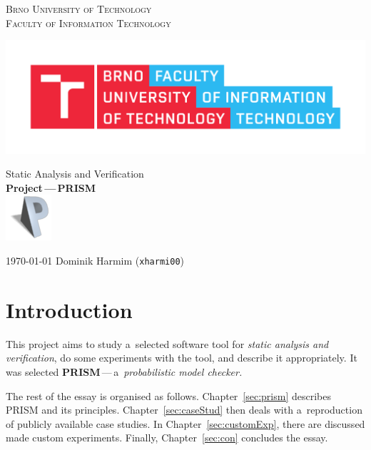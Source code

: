 \documentclass[a4paper, 11pt]{article}
\theoremstyle{definition}
\begin{document}
\begin{titlepage}
    \begin{center}
        \textsc{%
            \LARGE{Brno University of Technology} \\
            \smallskip
            \Large{Faculty of Information Technology}%
        }

        \includegraphics[width=.77 \linewidth]{FIT-logo.pdf}


        \Huge{Static Analysis and Verification} \\
        \LARGE{\textbf{Project\,---\,PRISM}} \\[1.5em]
        \includegraphics[width=.1 \linewidth]{prism-logo.png}

    \end{center}

    {\Large%
        \today
        \hfill
        Dominik Harmim (\texttt{xharmi00})%
    }
\end{titlepage}


\clearpage
{}
\setcounter{page}{1}
\tableofcontents


\clearpage
{}
\setcounter{page}{1}


\section{Introduction}

This project aims to study a~selected software tool for \emph{static
analysis and verification}, do some experiments with the tool, and
describe it appropriately. It was selected
\textbf{PRISM}\,---\,a~\emph{probabilistic model checker.}

The rest of the essay is organised as follows. Chapter~\ref{sec:prism}
describes PRISM and its principles. Chapter~\ref{sec:caseStud} then
deals with a~reproduction of publicly available case studies. In
Chapter~\ref{sec:customExp}, there are discussed made custom experiments.
Finally, Chapter~\ref{sec:con} concludes the essay.
\end{document}

